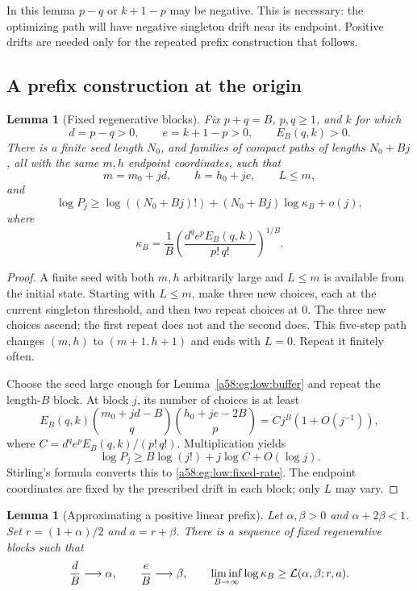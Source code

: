 \documentclass[11pt,letterpaper]{article}
\newtheorem{lemma}[theorem]{Lemma}
\theoremstyle{remark}
\begin{document}
In this lemma \(p-q\) or \(k+1-p\) may be negative. This is necessary:
the optimizing path will have negative singleton drift near its endpoint.
Positive drifts are needed only for the repeated prefix construction
that follows.

\subsection{A prefix construction at the origin}

\begin{lemma}[Fixed regenerative blocks]\label{a58:eg:low:fixed}
Fix \(p+q=B\), \(p,q\ge1\), and \(k\) for which
\[
 d=p-q>0,\qquad e=k+1-p>0,\qquad E_B(q,k)>0.
\]
There is a finite seed length \(N_0\), and families of compact paths
of lengths \(N_0+Bj\), all with the same \(m,h\) endpoint coordinates,
such that
\[
 m=m_0+jd,\qquad h=h_0+je,\qquad L\le m,
\]
and
\begin{equation}\label{a58:eg:low:fixed-rate}
 \log P_j\ge \log((N_0+Bj)!)
 +(N_0+Bj)\log\kappa_B+o(j),
\end{equation}
where
\begin{equation}\label{a58:eg:low:kappa}
 \kappa_B=\frac1B
 \left(\frac{d^q e^p E_B(q,k)}{p!\,q!}\right)^{1/B}.
\end{equation}
\end{lemma}

\begin{proof}
A finite seed with both \(m,h\) arbitrarily large and \(L\le m\)
is available from the initial state. Starting with \(L\le m\), make
three new choices, each at the current singleton threshold, and then
two repeat choices at \(0\). The three new choices ascend; the first
repeat does not and the second does. This five-step path changes
\((m,h)\) to \((m+1,h+1)\) and ends with \(L=0\).
Repeat it finitely often.

Choose the seed large enough for Lemma~\ref{a58:eg:low:buffer} and repeat the
length-\(B\) block. At block \(j\), its number of choices is at least
\[
 E_B(q,k)\binom{m_0+jd-B}{q}
             \binom{h_0+je-2B}{p}
 =Cj^B(1+O(j^{-1})),
\]
where \(C=d^qe^pE_B(q,k)/(p!\,q!)\).
Multiplication yields
\[
 \log P_j\ge B\log(j!)+j\log C+O(\log j).
\]
Stirling's formula converts this to \eqref{a58:eg:low:fixed-rate}.
The endpoint coordinates are fixed by the prescribed drift in each
block; only \(L\) may vary.
\end{proof}

\begin{lemma}[Approximating a positive linear prefix]\label{a58:eg:low:prefix}
Let \(\alpha,\beta>0\) and \(\alpha+2\beta<1\).
Set \(r=(1+\alpha)/2\) and \(a=r+\beta\).
There is a sequence of fixed regenerative blocks such that
\[
 \frac dB\longrightarrow\alpha,\qquad
 \frac eB\longrightarrow\beta,\qquad
 \liminf_{B\to\infty}\log\kappa_B
 \ge {\cal L}(\alpha,\beta;r,a).
\]
\end{lemma}
\end{document}
